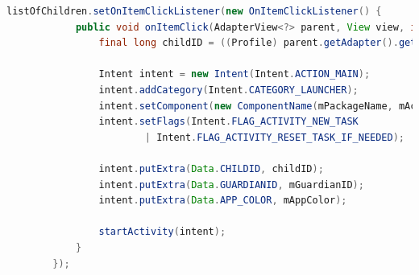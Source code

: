 \begin{lstlisting}[style=sourceCode, language=JAVA, caption=How the launcher makes the intent for launching an application, label=lst:profileActivity] 
listOfChildren.setOnItemClickListener(new OnItemClickListener() {
			public void onItemClick(AdapterView<?> parent, View view, int position, long id) {
				final long childID = ((Profile) parent.getAdapter().getItem(position)).getId();

				Intent intent = new Intent(Intent.ACTION_MAIN);
				intent.addCategory(Intent.CATEGORY_LAUNCHER);
				intent.setComponent(new ComponentName(mPackageName, mActivityName));
				intent.setFlags(Intent.FLAG_ACTIVITY_NEW_TASK
						| Intent.FLAG_ACTIVITY_RESET_TASK_IF_NEEDED);

				intent.putExtra(Data.CHILDID, childID);
				intent.putExtra(Data.GUARDIANID, mGuardianID);
				intent.putExtra(Data.APP_COLOR, mAppColor);

				startActivity(intent);
			}
		});
\end{lstlisting}